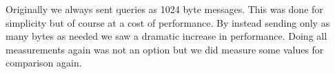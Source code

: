 Originally we always sent queries as 1024 byte messages. This was done for simplicity but of course at a cost of performance. By instead sending only as many bytes as needed we saw a dramatic increase in performance. Doing all measurements again was not an option but we did measure some values for comparison again.

















